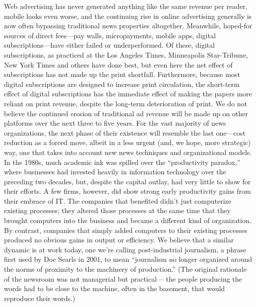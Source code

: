 Web advertising has never generated anything like the same revenue per reader,
mobile looks even worse, and the continuing rise in online advertising generally
is now often bypassing traditional news properties altogether. Meanwhile,
hoped-for sources of direct fees—pay walls, micropayments, mobile apps, digital
subscriptions—have either failed or underperformed.
Of these, digital subscriptions, as practiced at the Los Angeles Times, Minneapolis
Star-Tribune, New York Times and others have done best, but even here
the net effect of subscriptions has not made up the print shortfall. Furthermore,
because most digital subscriptions are designed to increase print circulation, the
short-term effect of digital subscriptions has the immediate effect of making
the papers more reliant on print revenue, despite the long-term deterioration
of print.
We do not believe the continued erosion of traditional ad revenue will be made
up on other platforms over the next three to five years. For the vast majority
of news organizations, the next phase of their existence will resemble the last
one—cost reduction as a forced move, albeit in a less urgent (and, we hope,
more strategic) way, one that takes into account new news techniques and
organizational models.
In the 1980s, much academic ink was spilled over the ``productivity paradox,''
where businesses had invested heavily in information technology over the preceding
two decades, but, despite the capital outlay, had very little to show for
their efforts. A few firms, however, did show strong early productivity gains from
their embrace of IT. The companies that benefited didn’t just computerize existing
processes; they altered those processes at the same time that they brought
computers into the business and became a different kind of organization. By
contrast, companies that simply added computers to their existing processes produced
no obvious gains in output or efficiency.
We believe that a similar dynamic is at work today, one we’re calling post-industrial
journalism, a phrase first used by Doc Searls in 2001, to mean ``journalism
no longer organized around the norms of proximity to the machinery of production.''
(The original rationale of the newsroom was not managerial but practical—
the people producing the words had to be close to the machine, often in the
basement, that would reproduce their words.)

